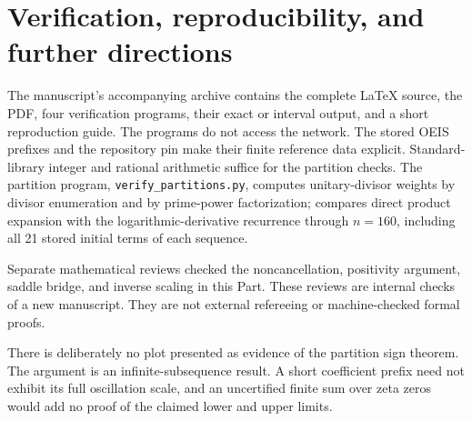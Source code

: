 \documentclass[11pt]{article}
\theoremstyle{remark}\newtheorem{remark}[theorem]{Remark}
\numberwithin{equation}{section}
\begin{document}
\section{Verification, reproducibility, and further directions}\label{udp:tw:sec:verify}
The manuscript's accompanying archive contains the complete \LaTeX{} source, the PDF,
four verification programs, their exact or interval output, and a short
reproduction guide. The programs do not access the network. The stored
OEIS prefixes and the repository pin make their finite reference data
explicit. Standard-library integer and rational arithmetic suffice for
the partition checks. The partition program,
\texttt{verify\_partitions.py},
computes unitary-divisor weights by divisor enumeration and by
prime-power factorization; compares direct product expansion with
the logarithmic-derivative recurrence through $n=160$, including all
21 stored initial terms of each sequence.

Separate mathematical reviews checked
the noncancellation, positivity argument, saddle bridge, and
inverse scaling in this Part. These reviews are internal checks of a
new manuscript. They are not external refereeing or machine-checked
formal proofs.

There is deliberately no plot presented as evidence of the partition
sign theorem. The argument is an infinite-subsequence result. A short
coefficient prefix need not exhibit its full oscillation scale, and
an uncertified finite sum over zeta zeros would add no proof of the
claimed lower and upper limits.
\end{document}
